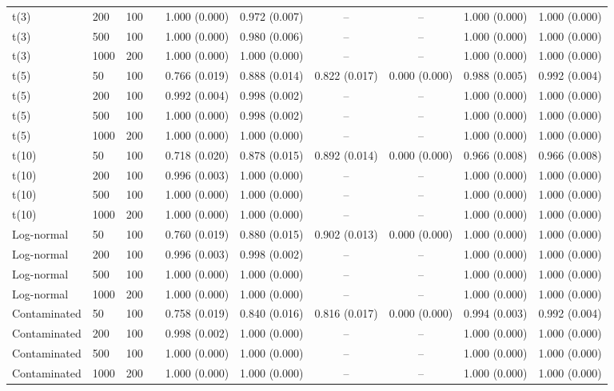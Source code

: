 \begin{table}[t]
\begin{tabular}{llllcccccc}
t(3) & 200 & 100 & & 1.000 (0.000) & 0.972 (0.007) & -- & -- & 1.000 (0.000) & 1.000 (0.000) \\
t(3) & 500 & 100 & & 1.000 (0.000) & 0.980 (0.006) & -- & -- & 1.000 (0.000) & 1.000 (0.000) \\
t(3) & 1000 & 200 & & 1.000 (0.000) & 1.000 (0.000) & -- & -- & 1.000 (0.000) & 1.000 (0.000) \\
t(5) & 50 & 100 & & 0.766 (0.019) & 0.888 (0.014) & 0.822 (0.017) & 0.000 (0.000) & 0.988 (0.005) & 0.992 (0.004) \\
t(5) & 200 & 100 & & 0.992 (0.004) & 0.998 (0.002) & -- & -- & 1.000 (0.000) & 1.000 (0.000) \\
t(5) & 500 & 100 & & 1.000 (0.000) & 0.998 (0.002) & -- & -- & 1.000 (0.000) & 1.000 (0.000) \\
t(5) & 1000 & 200 & & 1.000 (0.000) & 1.000 (0.000) & -- & -- & 1.000 (0.000) & 1.000 (0.000) \\
t(10) & 50 & 100 & & 0.718 (0.020) & 0.878 (0.015) & 0.892 (0.014) & 0.000 (0.000) & 0.966 (0.008) & 0.966 (0.008) \\
t(10) & 200 & 100 & & 0.996 (0.003) & 1.000 (0.000) & -- & -- & 1.000 (0.000) & 1.000 (0.000) \\
t(10) & 500 & 100 & & 1.000 (0.000) & 1.000 (0.000) & -- & -- & 1.000 (0.000) & 1.000 (0.000) \\
t(10) & 1000 & 200 & & 1.000 (0.000) & 1.000 (0.000) & -- & -- & 1.000 (0.000) & 1.000 (0.000) \\
Log-normal & 50 & 100 & & 0.760 (0.019) & 0.880 (0.015) & 0.902 (0.013) & 0.000 (0.000) & 1.000 (0.000) & 1.000 (0.000) \\
Log-normal & 200 & 100 & & 0.996 (0.003) & 0.998 (0.002) & -- & -- & 1.000 (0.000) & 1.000 (0.000) \\
Log-normal & 500 & 100 & & 1.000 (0.000) & 1.000 (0.000) & -- & -- & 1.000 (0.000) & 1.000 (0.000) \\
Log-normal & 1000 & 200 & & 1.000 (0.000) & 1.000 (0.000) & -- & -- & 1.000 (0.000) & 1.000 (0.000) \\
Contaminated & 50 & 100 & & 0.758 (0.019) & 0.840 (0.016) & 0.816 (0.017) & 0.000 (0.000) & 0.994 (0.003) & 0.992 (0.004) \\
Contaminated & 200 & 100 & & 0.998 (0.002) & 1.000 (0.000) & -- & -- & 1.000 (0.000) & 1.000 (0.000) \\
Contaminated & 500 & 100 & & 1.000 (0.000) & 1.000 (0.000) & -- & -- & 1.000 (0.000) & 1.000 (0.000) \\
Contaminated & 1000 & 200 & & 1.000 (0.000) & 1.000 (0.000) & -- & -- & 1.000 (0.000) & 1.000 (0.000) \\
\bottomrule
\end{tabular}
\end{table}